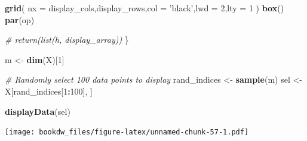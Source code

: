 \documentclass[
]{book}
\newenvironment{Shaded}{\begin{snugshade}}{\end{snugshade}}
\newcommand{\CommentTok}[1]{\textcolor[rgb]{0.56,0.35,0.01}{\textit{#1}}}
\newcommand{\DataTypeTok}[1]{\textcolor[rgb]{0.13,0.29,0.53}{#1}}
\newcommand{\DecValTok}[1]{\textcolor[rgb]{0.00,0.00,0.81}{#1}}
\newcommand{\KeywordTok}[1]{\textcolor[rgb]{0.13,0.29,0.53}{\textbf{#1}}}
\newcommand{\NormalTok}[1]{#1}
\newcommand{\OperatorTok}[1]{\textcolor[rgb]{0.81,0.36,0.00}{\textbf{#1}}}
\newcommand{\StringTok}[1]{\textcolor[rgb]{0.31,0.60,0.02}{#1}}
\begin{document}
\begin{Shaded}
\begin{Highlighting}[]
  \KeywordTok{grid}\NormalTok{(}
    \DataTypeTok{nx =}\NormalTok{ display_cols,display_rows,}\DataTypeTok{col =} \StringTok{'black'}\NormalTok{,}\DataTypeTok{lwd =} \DecValTok{2}\NormalTok{,}\DataTypeTok{lty =} \DecValTok{1}
\NormalTok{  )}
  \KeywordTok{box}\NormalTok{()}
  \KeywordTok{par}\NormalTok{(op)}
        
        
        \CommentTok{# return(list(h, display_array))}
\NormalTok{\}}

\NormalTok{m <-}\StringTok{ }\KeywordTok{dim}\NormalTok{(X)[}\DecValTok{1}\NormalTok{]}

\CommentTok{# Randomly select 100 data points to display}
\NormalTok{rand_indices <-}\StringTok{ }\KeywordTok{sample}\NormalTok{(m)}
\NormalTok{sel <-}\StringTok{ }\NormalTok{X[rand_indices[}\DecValTok{1}\OperatorTok{:}\DecValTok{100}\NormalTok{], ]}

\KeywordTok{displayData}\NormalTok{(sel)}
\end{Highlighting}
\end{Shaded}

\texttt{[image: bookdw\_files/figure-latex/unnamed-chunk-57-1.pdf]}

  
\end{document}
